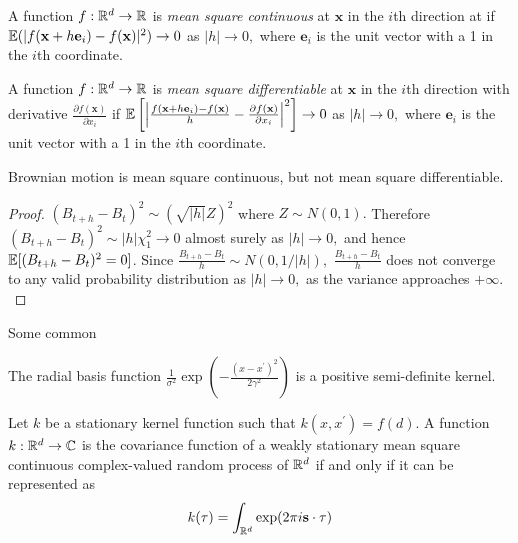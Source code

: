 \begin{definition}
    A function $f:\mathbb{R}^d\to\mathbb{R}$ is \emph{mean square continuous} at $\mathbf{x}$ in the $i$th direction at if $\operatorname{\mathbb{E}}(|f(\mathbf{x} + h\mathbf{e}_i) - f(\mathbf{x})|^2)\to 0$ as $|h|\to 0,$ where $\mathbf{e}_i$ is the unit vector with a 1 in the $i$th coordinate.
\end{definition}

\begin{definition}
    A function $f:\mathbb{R}^d\to\mathbb{R}$ is \emph{mean square differentiable} at $\mathbf{x}$ in the $i$th direction with derivative $\frac{\partial f(\mathbf{x})}{\partial x_i}$ if $\operatorname{\mathbb{E}}\left[\left|\frac{f(\mathbf{x} + h\mathbf{e}_i) - f(\mathbf{x})}{h} - \frac{\partial f(\mathbf{x})}{\partial x_i}\right|^2\right]\to 0$ as $|h|\to 0,$ where $\mathbf{e}_i$ is the unit vector with a 1 in the $i$th coordinate.
\end{definition}

\begin{theorem}
    Brownian motion is mean square continuous, but not mean square differentiable.
\end{theorem}
\begin{proof}
    $(B_{t + h} - B_t)^2 \sim (\sqrt{|h|}Z)^2$ where $Z\sim N(0,1).$ Therefore $(B_{t + h} - B_t)^2 \sim |h|\chi_1^2 \to 0$ almost surely as $|h|\to 0,$ and hence $\operatorname{\mathbb{E}}[(B_{t + h} - B_t)^2= 0]$. Since $\frac{B_{t + h} - B_t}{h} \sim N(0, 1/|h|),$ $\frac{B_{t + h} - B_t}{h}$ does not converge to any valid probability distribution as $|h| \to 0,$ as the variance approaches $+\infty.$
\end{proof}

Some common

\color{red}

\begin{theorem}\label{thm:rbf_pos_def}
    The radial basis function
    $\frac{1}{\sigma^2}\exp(-\frac{(x - x^\prime)^2}{2\gamma^2})$ is a positive
    semi-definite kernel.
\end{theorem}

\begin{theorem}
    Let $k$ be a stationary kernel function such that
    $k(x, x^\prime) = f(d)$. A function $k:\mathbb{R}^d\to\mathbb{C}$ is the covariance
    function of a weakly
    stationary mean square continuous complex-valued random process of $\mathbb{R}^d$
    if and only if it can be represented as
    $$k(\mathbf{\tau}) = \int_{\mathbb{R}^d} \exp(2\pi i \mathbf{s}\cdot\mathbf{\tau})$$
\end{theorem}

